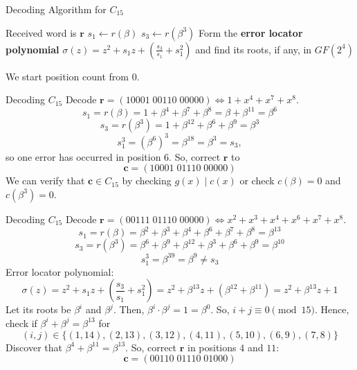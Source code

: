 \begin{algbox}
    \begin{algorithm}[H]
        \DontPrintSemicolon{}
        \caption{Decoding Algorithm for $ C_{15} $}
        Received word is $ \bm{r} $\;
        $ s_1\gets r(\beta) $\;
        $ s_3\gets r(\beta^3) $\;
         {
        }
         {
         {
        }
        }
         {
            \Return{}
        }
        Form the \textbf{error locator polynomial}
        $ \sigma(z)=z^2+s_1z+\left( \frac{s_3}{s_1} +s_1^2 \right) $ and find its
        roots, if any, in $ GF(2^4) $\;
         {
        }
        \Return{}
    \end{algorithm}
\end{algbox}

\begin{Remark}{}{}
    We start position count from $ 0 $.
\end{Remark}


\begin{Example}{Decoding $ C_{15} $}{}
    Decode $ \bm{r}=(10001\; 00110\; 00000)\iff 1+x^4+x^7+x^8 $.
    \[ s_1=r(\beta)=1+\beta^4+\beta^7+\beta^8=\beta+\beta^{11}=\beta^6 \]
    \[ s_3=r(\beta^3)=1+\beta^{12}+\beta^{6}+\beta^9=\beta^3 \]
    \[ s_1^3=(\beta^6)^3=\beta^{18}=\beta^3=s_3, \]
    so one error has occurred in position $ 6 $. So, correct $ \bm{r} $ to
    \[ \bm{c}=(10001\; 01110\; 00000) \]
    We can verify that $ \bm{c}\in C_{15} $ by checking $ g(x)\mid c(x) $
    or check $ c(\beta)=0 $ and $ c(\beta^3)=0 $.
\end{Example}



\begin{Example}{Decoding $ C_{15} $}{}
    Decode $ \bm{r}=(00111\; 01110\; 00000)\iff x^2+x^3+x^4+x^6+x^7+x^8 $.
    \[ s_1=r(\beta)=\beta^2+\beta^3+\beta^4+\beta^6+\beta^7+\beta^8=\beta^{13} \]
    \[ s_3=r(\beta^3)=\beta^6+\beta^9+\beta^{12}+\beta^3+\beta^6+\beta^9=\beta^{10} \]
    \[ s_1^3=\beta^{39}=\beta^9\neq s_3 \]
    Error locator polynomial:
    \[ \sigma(z)=z^2+s_1z+\left(\frac{s_3}{s_1}+s_1^2 \right)
        =z^2+\beta^{13}z+(\beta^{12}+\beta^{11})=z^2+\beta^{13}z+1 \]
    Let its roots be $ \beta^i $ and $ \beta^j $. Then, $ \beta^i\cdot \beta^j=1=
        \beta^0 $. So, $ i+j\equiv 0\pmod{15} $. Hence, check if $ \beta^i+\beta^j=\beta^{13} $
    for
    \[ (i,j)\in \{(1,14),(2,13),(3,12),(4,11),(5,10),(6,9),(7,8)\} \]
    Discover that $ \beta^4+\beta^{11}=\beta^{13} $. So, correct $ \bm{r} $
    in positions $ 4 $ and $ 11 $:
    \[ \bm{c}=(00110\; 01110\; 01000) \]
\end{Example}


